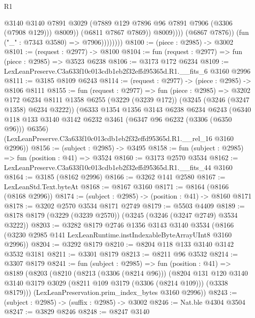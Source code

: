 \begin{lexlean}{R1}
\begin{coremodule}
                                  @3140
                                  @3140
                                  @7891
                                  @3029
                                  (@7889 @129 @7896 @96 @7891 @7906 (@3306 (@7908 @129)))
                                  @8009))
                              (@6811 @7867 @7869))
                            @8009))))
                    (@6867 @7876))
                  (fun ("_" : @7343 @3580) => @7906))))))))
@8100 := (piece : @2985) -> @3002
@8101 := (request : @2977) -> @8100
@8104 := fun (request : @2977) => fun (piece : @2985) => @3523 @6238
@8106 := @3173 @172 @6234
@8109 := LexLeanPreserve.C3a633f10c013cdb1eb2f32effd95365d.R1.__fits_6 @3160 @2996
@8111 := @3185 @8109 @6243
@8114 := (request : @2977) -> (piece : @2985) -> @8106 @8111
@8155 := fun (request : @2977) =>
  fun (piece : @2985) =>
  @3202
    @172
    @6234
    @8111
    @1358
    @6255
    (@3229 (@3239 @172))
    (@3245 (@3246 (@3247 @1358) @6234 @3222))
    (@6333
      @1354
      @1356
      @3143
      @6238
      @6234
      @6243
      (@6340 @118 @133 @3140 @3142 @6232 @3461 (@6347 @96 @6232 (@3306 (@6350 @96))) @6356)
      (LexLeanPreserve.C3a633f10c013cdb1eb2f32effd95365d.R1.__rel_16 @3160 @2996))
@8156 := (subject : @2985) -> @3495
@8158 := fun (subject : @2985) => fun (position : @41) => @3524
@8160 := @3173 @2570 @3534
@8162 := LexLeanPreserve.C3a633f10c013cdb1eb2f32effd95365d.R1.__fits_44 @3160
@8164 := @3185 (@8162 @2996)
@8166 := @3262 @141 @2580
@8167 := LexLeanStd.Text.byteAt
@8168 := @8167 @3160
@8171 := @8164 (@8166 (@8168 @2996))
@8174 := (subject : @2985) -> (position : @41) -> @8160 @8171
@8178 := @3202 @2570 @3534 @8171 @2749
@8179 := @5503 @4409
@8189 := @8178 @8179 (@3229 (@3239 @2570)) (@3245 (@3246 (@3247 @2749) @3534 @3222))
@8203 := @3282
    @8179
    @2746
    @1356
    @3143
    @3140
    @3534
    (@8166 (@3230 @2985 @141 LexLeanRuntime.instIndexableByteArrayUInt8 @3160 @2996))
@8204 := @3292 @8179
@8210 := @8204 @118 @133 @3140 @3142 @3532 @3181
@8211 := @3301 @8179
@8213 := @8211 @96 @3532
@8214 := @3307 @8179
@8241 := fun (subject : @2985) =>
  fun (position : @41) =>
  @8189
    (@8203
      (@8210
        (@8213 (@3306 (@8214 @96)))
        (@8204
          @131
          @120
          @3140
          @3140
          @3179
          @3029
          (@8211 @109 @3179 (@3306 (@8214 @109)))
          (@3338 @8179)))
      (LexLeanPreservation.prim_index_bytes @3160 @2996))
@8243 := (subject : @2985) -> (suffix : @2985) -> @3002
@8246 := Nat.ble @4304 @3504
@8247 := @3829 @8246
@8248 := @8247 @3140

\end{coremodule}
\end{lexlean}

